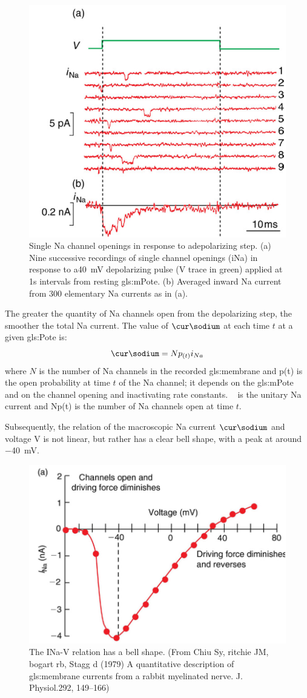 \documentclass[class={.NoTouch/myProject}, crop=false]{standalone}
\begin{document}
\begin{figure}[H]
    \centering
    \includegraphics[width=0.5\linewidth]{Pictures//Anakin/iNa.png}
    \caption{Single \gls{Na} channel openings in response to adepolarizing step. (a) Nine successive recordings of single channel openings (iNa) in response to a\qty{ 40}{\mV} depolarizing pulse (V trace in green) applied at 1s intervals from resting \gls{gls:mPote}. (b) Averaged inward \gls{Na} current from 300 elementary \gls{Na} currents as in (a).  }
    \label{fig:enter-label}
\end{figure}

The greater the quantity of \gls{Na} channels open from the depolarizing step, the smoother the total \gls{Na} current. The value of \(\unit{\cur\sodium}\) at each time \(t\) at a given \gls{gls:Pote} is: 
\begin{equation}
    \unit{\cur\sodium}=N p_{(t)} i_{Na}
\end{equation}
where \(N\) is the number of \gls{Na} channels in the recorded \gls{gls:membrane} and p(t) is the open probability at time \(t\) of the \gls{Na} channel; it depends on the \gls{gls:mPote} and on the channel opening and inactivating rate constants. \unit{\cur\sodium} is the unitary \gls{Na} current and Np(t) is the number of \gls{Na} channels open at time \(t\). 

Subsequently, the relation of the macroscopic \gls{Na} current \(\unit{\cur\sodium}\) and voltage \(\unit{\V}\) is not linear, but rather has a clear bell shape, with a peak at around \qty{-40}{\mV}. 
\begin{figure}[H]
    \centering
    \includegraphics[width=0.5\linewidth]{Pictures//Anakin/I-V.bell.png}
    \caption{The INa-V relation has a bell shape. (From Chiu Sy, ritchie JM, bogart rb, Stagg d (1979) A quantitative description of \gls{gls:membrane} currents from a rabbit myelinated nerve. J. Physiol.292, 149–166)}
    \label{fig:enter-label}
\end{figure}
 
\end{document}
